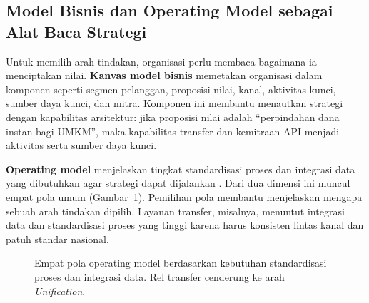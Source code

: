 \subsection{Model Bisnis dan Operating Model sebagai Alat Baca Strategi}

Untuk memilih arah tindakan, organisasi perlu membaca bagaimana ia menciptakan
nilai. \textbf{Kanvas model bisnis} memetakan organisasi dalam komponen seperti
segmen pelanggan, proposisi nilai, kanal, aktivitas kunci, sumber daya kunci,
dan mitra. Komponen ini membantu menautkan strategi dengan kapabilitas
arsitektur: jika proposisi nilai adalah ``perpindahan dana instan bagi UMKM'',
maka kapabilitas transfer dan kemitraan API menjadi aktivitas serta sumber daya
kunci.

\textbf{Operating model} menjelaskan tingkat standardisasi proses dan integrasi
data yang dibutuhkan agar strategi dapat dijalankan \cite{ross2006enterprise}.
Dari dua dimensi ini muncul empat pola umum (Gambar~\ref{fig:operating-model}).
Pemilihan pola membantu menjelaskan mengapa sebuah arah tindakan dipilih.
Layanan transfer, misalnya, menuntut integrasi data dan standardisasi proses
yang tinggi karena harus konsisten lintas kanal dan patuh standar nasional.

\begin{figure}[htbp]
\centering
{}
\caption{Empat pola operating model berdasarkan kebutuhan standardisasi proses
dan integrasi data. Rel transfer cenderung ke arah \emph{Unification}.}
\label{fig:operating-model}
\end{figure}

